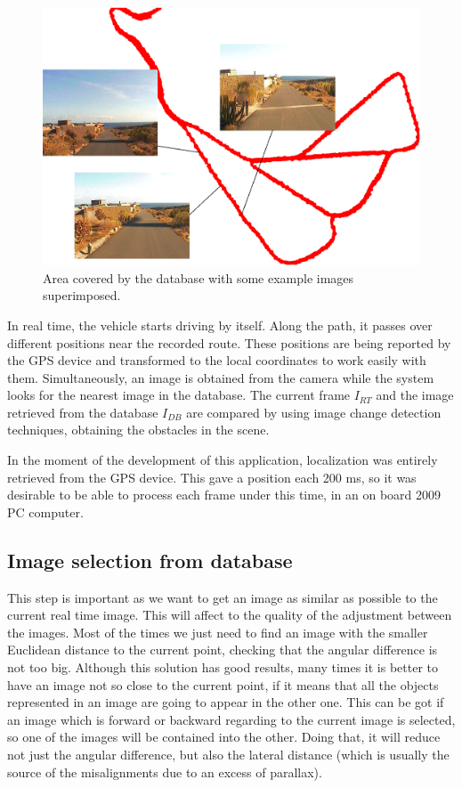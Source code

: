 \begin{figure}[thb]
  \centering
  \includegraphics{database}
  \caption{Area covered by the database with some example images superimposed.}
  \label{fig:cp01_image_database}
\end{figure}

In real time, the vehicle starts driving by itself. Along the path, it passes over different positions near the recorded route. These positions are being reported by the \ac{GPS} device and transformed to the local coordinates to work easily with them. Simultaneously, an image is obtained from the camera while the system looks for the nearest image in the database. The current frame $I_{RT}$ and the image retrieved from the database $I_{DB}$ are compared by using image change detection techniques, obtaining the obstacles in the scene.

In the moment of the development of this application, localization was entirely retrieved from the \ac{GPS} device. This gave a position each 200 ms, so it was desirable to be able to process each frame under this time, in an on board 2009 PC computer.

\subsection{Image selection from database}\label{ch:chapter01_01_01}

This step is important as we want to get an image as similar as possible to the current real time image. This will affect to the quality of the adjustment between the images. Most of the times we just need to find an image with the smaller Euclidean distance to the current point, checking that the angular difference is not too big. Although this solution has good results, many times it is better to have an image not so close to the current point, if it means that all the objects represented in an image are going to appear in the other one. This can be got if an image which is forward or backward regarding to the current image is selected, so one of the images will be contained into the other. Doing that, it will reduce not just the angular difference, but also the lateral distance (which is usually the source of the misalignments due to an excess of parallax).

